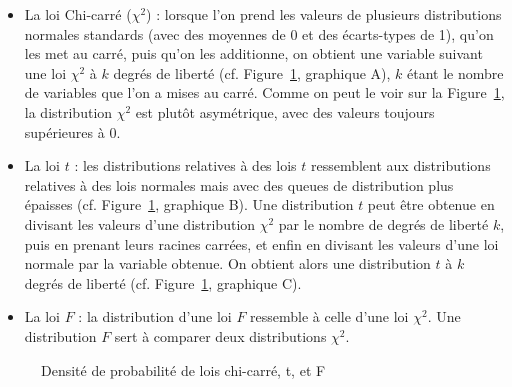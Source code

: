 \documentclass[
  letterpaper,
]{book}
\begin{document}
\begin{itemize}
\item
  La loi Chi-carré (\(\chi^2\)) : lorsque l'on prend les valeurs de
  plusieurs distributions normales standards (avec des moyennes de 0 et
  des écarts-types de 1), qu'on les met au carré, puis qu'on les
  additionne, on obtient une variable suivant une loi \(\chi^2\) à \(k\)
  degrés de liberté (cf. Figure~\ref{fig-VariousQuantLaws}, graphique
  A), \(k\) étant le nombre de variables que l'on a mises au carré.
  Comme on peut le voir sur la Figure~\ref{fig-VariousQuantLaws}, la
  distribution \(\chi^2\) est plutôt asymétrique, avec des valeurs
  toujours supérieures à 0.
\item
  La loi \(t\) : les distributions relatives à des lois \(t\)
  ressemblent aux distributions relatives à des lois normales mais avec
  des queues de distribution plus épaisses (cf.
  Figure~\ref{fig-VariousQuantLaws}, graphique B). Une distribution
  \(t\) peut être obtenue en divisant les valeurs d'une distribution
  \(\chi^2\) par le nombre de degrés de liberté \(k\), puis en prenant
  leurs racines carrées, et enfin en divisant les valeurs d'une loi
  normale par la variable obtenue. On obtient alors une distribution
  \(t\) à \(k\) degrés de liberté (cf.
  Figure~\ref{fig-VariousQuantLaws}, graphique C).
\item
  La loi \(F\) : la distribution d'une loi \(F\) ressemble à celle d'une
  loi \(\chi^2\). Une distribution \(F\) sert à comparer deux
  distributions \(\chi^2\).
\end{itemize}

\begin{figure}


\caption{\label{fig-VariousQuantLaws}Densité de probabilité de lois
chi-carré, t, et F}

\end{figure}%
\end{document}
